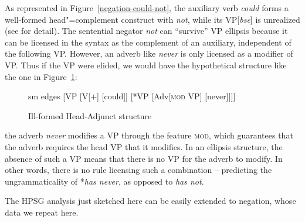 \documentclass[output=paper
 	        ,biblatex
                ,babelshorthands
                ,newtxmath
                ,draftmode
                ,colorlinks, citecolor=brown
]{langscibook}
\begin{document}
\begin{exe}
\begin{xlist}
\begin{exe}
\begin{xlist}
As represented in Figure~\ref{negation-could-not}, the auxiliary verb \textit{could} forms a well-formed head"=complement construct with \textit{not}, while its
VP[\textit{bse}] is unrealized (see \citealt{Kim:00, KS:08} for
detail). The sentential negator \textit{not} can ``survive'' VP ellipsis because it can be
licensed in the syntax as the complement of an auxiliary, independent
of the following VP.  However, an adverb like \textit{never} is only
licensed as a modifier of VP. Thus if the VP were elided, we would have the hypothetical
structure like the one in Figure~\ref{negation-fig-could-never}:
\begin{figure}
	\begin{forest}
		sm edges
		[VP
			[V{[\aux $+$]}
				[could]]
			[*VP
				[Adv{[\textsc{mod} VP]}
					[never]]]]
	\end{forest}
\caption{Ill-formed Head-Adjunct structure}\label{negation-fig-could-never}
\end{figure}
the adverb \textit{never} modifies a VP through the feature \textsc{mod},
which guarantees that the adverb requires the head VP that it
modifies. In an ellipsis structure, the absence of such a VP means
that there is no VP for the adverb to modify.  In other words, there
is no rule licensing such a combination -- predicting the
ungrammaticality of *\textit{has never},  as opposed to \textit{has not}.


The HPSG analysis just sketched here can be easily extended to  negation, whose
data we repeat here.

\eal
{}
\zl


\end{xlist}
\end{exe}
\end{xlist}
\end{exe}
\end{document}
